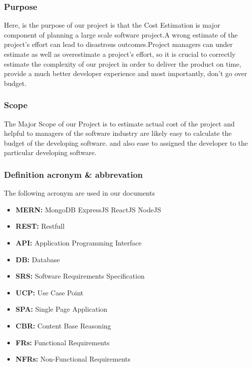     \subsubsection{Purpose}
    Here, is the purpose of our project is that the Cost Estimation is major component
    of planning a large scale software project.A wrong estimate of the project’s effort
    can lead to disastrous outcomes.Project managers can under estimate as well as 
    overestimate a project’s effort, so it is crucial to correctly estimate the 
    complexity of our project in order to deliver the product on time, provide a 
    much better developer experience and most importantly, don’t go over budget.


    \subsubsection[1pt]{Scope}
    The Major Scope of our Project is to estimate actual cost of the project and helpful to
    managers of the software industry are likely easy to calculate the budget of the developing software.
    and also ease to assigned the developer to the particular developing software. \\
    \subsubsection{Definition acronym \& abbrevation}
    The following acronym are used in our documents
    \begin{center}
        \begin{itemize}
            \item {\bfseries MERN:} MongoDB ExpressJS ReactJS NodeJS
            \item {\bfseries REST:} Restfull
            \item {\bfseries API:} Application Programming Interface
            \item {\bfseries DB:} Database
            \item {\bfseries SRS:} Software Requirements Specification
            \item {\bfseries UCP:} Use Case Point
            \item {\bfseries SPA:} Single Page Application
            \item {\bfseries CBR:} Content Base Reasoning
            \item {\bfseries FRs:} Functional Requirements
            \item {\bfseries NFRs:} Non-Functional Requirements
            \end{itemize}
    \end{center}
    

